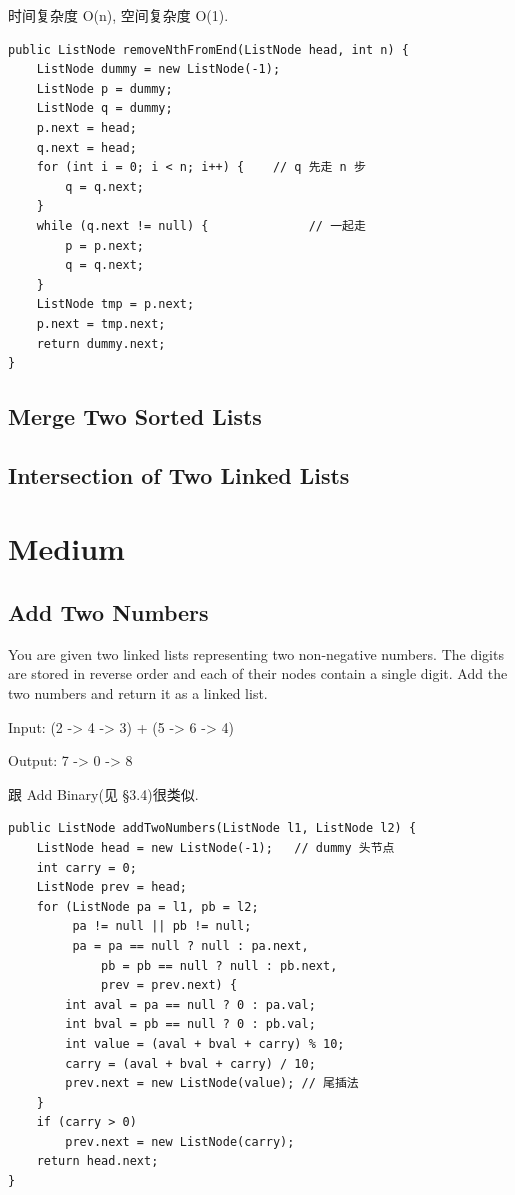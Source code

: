 \documentclass[12pt]{book}
\begin{document}
时间复杂度 O(n), 空间复杂度 O(1). 

\lstset{language=java,label= ,caption= ,numbers=none}
\begin{lstlisting}
public ListNode removeNthFromEnd(ListNode head, int n) {
    ListNode dummy = new ListNode(-1);
    ListNode p = dummy;
    ListNode q = dummy;
    p.next = head;
    q.next = head;
    for (int i = 0; i < n; i++) {    // q 先走 n 步
        q = q.next;
    }
    while (q.next != null) {              // 一起走
        p = p.next;
        q = q.next;
    }
    ListNode tmp = p.next;
    p.next = tmp.next;
    return dummy.next;
}
\end{lstlisting}

\subsection{Merge Two Sorted Lists}
\label{sec-3-1-3}
\subsection{Intersection of Two Linked Lists}
\label{sec-3-1-4}
\section{Medium}
\label{sec-3-2}
\subsection{Add Two Numbers}
\label{sec-3-2-1}
You are given two linked lists representing two non-negative numbers. The digits are stored in reverse order and each of their nodes contain a single digit. Add the two numbers and return it as a linked list.

Input: (2 -> 4 -> 3) + (5 -> 6 -> 4)

Output: 7 -> 0 -> 8

跟 Add Binary(见 §3.4)很类似. 

\lstset{language=java,label= ,caption= ,numbers=none}
\begin{lstlisting}
public ListNode addTwoNumbers(ListNode l1, ListNode l2) {
    ListNode head = new ListNode(-1);   // dummy 头节点
    int carry = 0;
    ListNode prev = head;
    for (ListNode pa = l1, pb = l2;
         pa != null || pb != null;
         pa = pa == null ? null : pa.next,
             pb = pb == null ? null : pb.next,
             prev = prev.next) {
        int aval = pa == null ? 0 : pa.val;
        int bval = pb == null ? 0 : pb.val;
        int value = (aval + bval + carry) % 10;
        carry = (aval + bval + carry) / 10;
        prev.next = new ListNode(value); // 尾插法
    }
    if (carry > 0)
        prev.next = new ListNode(carry);
    return head.next;
}
\end{lstlisting}
\end{document}
